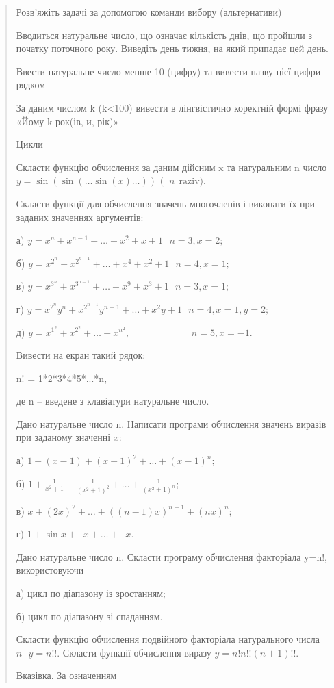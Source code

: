 \documentclass[]{article}
\begin{document}
\begin{quote}
Розв'яжіть задачі за допомогою команди вибору (альтернативи)

Вводиться натуральне число, що означає кількість днів, що пройшли з
початку поточного року. Виведіть день тижня, на який припадає цей день.

Ввести натуральне число менше 10 (цифру) та вивести назву цієї цифри
рядком

За даним числом k (k\textless{}100) вивести в лінгвістично коректній
формі фразу «Йому k рок(ів, и, рік)»

\protect\hypertarget{_Hlk63534941}{}{}

Цикли

Скласти функцію обчислення за даним дійсним x та натуральним n число
\(y = \sin(\sin(\ldots\sin(x)\ldots))\) \((\)
\(\mathrm{\ }n\mathrm{\ \ raziv}).\)

Скласти функції для обчислення значень многочленів і виконати їх при
заданих значеннях аргументів:

а)
\(y = x^{n} + x^{n - 1} + \ldots + x^{2} + x + 1\mathrm{\text{\ \ \ \ \ \ \ \ \ \ \ \ \ \ \ \ \ \ \ \ }}n = 3,x = 2;\)

б)
\(y = x^{2^{n}} + x^{2^{n - 1}} + \ldots + x^{4} + x^{2} + 1\mathrm{\text{\ \ \ \ \ \ \ \ \ \ \ \ \ \ \ }}n = 4,x = 1;\)

в)
\(y = x^{3^{n}} + x^{3^{n - 1}} + \ldots + x^{9} + x^{3} + 1\mathrm{\text{\ \ \ \ \ \ \ \ \ \ \ \ \ \ \ \ }}n = 3,x = 1;\)

г)
\(y = x^{2^{n}}y^{n} + x^{2^{n - 1}}y^{n - 1} + \ldots + x^{2}y + 1\mathrm{\text{\ \ \ \ \ \ \ \ \ \ }}n = 4,x = 1,y = 2;\)

д)
\(y = x^{1^{2}} + x^{2^{2}} + \ldots + x^{n^{2}}\mathrm{,\ \ \ \ \ \ \ \ \ \ \ \ \ \ \ \ \ \ \ \ \ \ \ \ \ \ \ \ \ }n = 5,x = - 1.\)

Вивести на екран такий рядок:

n! = 1*2*3*4*5*...*n,

де n -- введене з клавіатури натуральне число.

Дано натуральне число \(\text{n.}\) Написати програми обчислення значень
виразів при заданому значенні \(x\):

а) \(1 + (x - 1) + (x - 1)^{2} + \ldots + (x - 1)^{n};\)

б)
\(1 + \frac{1}{x^{2} + 1} + \frac{1}{(x^{2} + 1)^{2}} + \ldots + \frac{1}{(x^{2} + 1)^{n}};\)

в) \(x + (2x)^{2} + \ldots + ((n - 1)x)^{n - 1} + (nx)^{n};\)

г) \(1 + \sin x + \operatorname{}x + \ldots + \operatorname{}x.\)

Дано натуральне число n. Скласти програму обчислення факторіала y=n!,
використовуючи

а) цикл по діапазону із зростанням;

б) цикл по діапазону зі спаданням.

Скласти функцію обчислення подвійного факторіала натурального числа
\(n\mathrm{\text{\ \ }}y = n!!.\) Скласти функції обчислення виразу
\(y = n!n!!(n + 1)!!.\)

Вказівка. За означенням
\end{quote}
\end{document}
